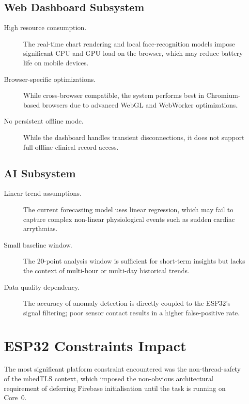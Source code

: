 \subsection{Web Dashboard Subsystem}
\begin{description}
	\item[High resource consumption.] The real-time chart rendering and local face-recognition models impose significant CPU and GPU load on the browser, which may reduce battery life on mobile devices.
	\item[Browser-specific optimizations.] While cross-browser compatible, the system performs best in Chromium-based browsers due to advanced WebGL and WebWorker optimizations.
	\item[No persistent offline mode.] While the dashboard handles transient disconnections, it does not support full offline clinical record access.
\end{description}

\subsection{AI Subsystem}
\begin{description}
	\item[Linear trend assumptions.] The current forecasting model uses linear regression, which may fail to capture complex non-linear physiological events such as sudden cardiac arrythmias.
	\item[Small baseline window.] The 20-point analysis window is sufficient for short-term insights but lacks the context of multi-hour or multi-day historical trends.
	\item[Data quality dependency.] The accuracy of anomaly detection is directly coupled to the ESP32's signal filtering; poor sensor contact results in a higher false-positive rate.
\end{description}

\section{ESP32 Constraints Impact}

The most significant platform constraint encountered was the non-thread-safety of
the mbedTLS context, which imposed the non-obvious architectural requirement of
deferring Firebase initialisation until the task is running on Core~0.

